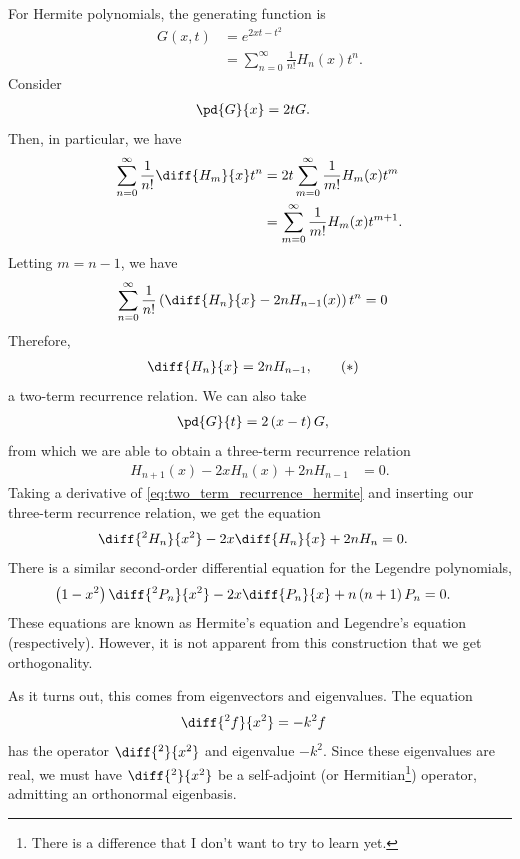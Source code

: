 \documentclass[10pt]{mypackage}
\begin{document}
  For Hermite polynomials, the generating function is
  \begin{align*}
    G\left( x,t \right) &= e^{2xt - t^2}\\
                        &= \sum_{n=0}^{\infty}\frac{1}{n!}H_{n}\left( x \right)t^{n}.
  \end{align*}
  Consider
  \begin{align*}
    \pd{G}{x} &= 2tG.
  \end{align*}
  Then, in particular, we have 
  \begin{align*}
    \sum_{n=0}^{\infty}\frac{1}{n!}\diff{H_m}{x}t^{n} &= 2t \sum_{m=0}^{\infty}\frac{1}{m!}H_m(x)t^{m}\\
                                                      &= \sum_{m=0}^{\infty}\frac{1}{m!}H_m(x)t^{m+1}.
  \end{align*}
  Letting $m = n-1$, we have
  \begin{align*}
    \sum_{n=0}^{\infty} \frac{1}{n!}\left(\diff{H_n}{x}-2nH_{n-1}(x) \right)t^{n} &= 0
  \end{align*}
  Therefore,
  \begin{align*}
    \diff{H_n}{x} &= 2nH_{n-1},\label{eq:two_term_recurrence_hermite}\tag{\textasteriskcentered}
  \end{align*}
  a two-term recurrence relation. We can also take
  \begin{align*}
    \pd{G}{t} &= 2\left( x-t \right)G,
  \end{align*}
  from which we are able to obtain a three-term recurrence relation
  \begin{align*}
    H_{n+1}(x) - 2xH_{n}(x) + 2nH_{n-1} &= 0.
  \end{align*}
  Taking a derivative of \eqref{eq:two_term_recurrence_hermite} and inserting our three-term recurrence relation, we get the equation
  \begin{align*}
    \diff{^2H_n}{x^2} - 2x \diff{H_n}{x} + 2nH_n &= 0.
  \end{align*}
  There is a similar second-order differential equation for the Legendre polynomials,
  \begin{align*}
    \left( 1-x^2 \right)\diff{^2P_{n}}{x^2} - 2x\diff{P_n}{x} + n\left( n+1 \right)P_n &= 0.
  \end{align*}
  These equations are known as Hermite's equation and Legendre's equation (respectively). However, it is not apparent from this construction that we get orthogonality.\newline

  As it turns out, this comes from eigenvectors and eigenvalues. The equation
  \begin{align*}
    \diff{^2f}{x^2} &= -k^2 f
  \end{align*}
  has the operator $\diff{^2}{x^2}$ and eigenvalue $-k^2$. Since these eigenvalues are real, we must have $\diff{^2}{x^2}$ be a self-adjoint (or Hermitian\footnote{There is a difference that I don't want to try to learn yet.}) operator, admitting an orthonormal eigenbasis.
\end{document}
